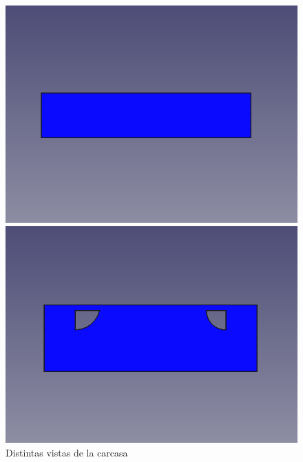 \begin{figure}[ht!]
\begin{minipage}{0.45\linewidth}
		\includegraphics[width=\linewidth]{figs/cap5/superior3.png}
		\caption*{\centering}  %
	\end{minipage}
	\hspace{1cm}
	\begin{minipage}{0.45\linewidth}
		\centering
		\includegraphics[width=\linewidth]{figs/cap5/superior4.png}
		\caption*{\centering} %
	\end{minipage}
	
	\caption{Distintas vistas de la carcasa}
	\label{fig:psuperior}
\end{figure}


